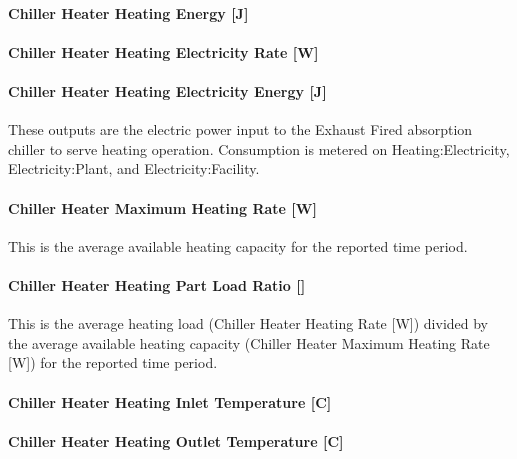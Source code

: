 \paragraph{Chiller Heater Heating Energy {[}J{]}}\label{chiller-heater-heating-energy-j-1}

\paragraph{Chiller Heater Heating Electricity Rate {[}W{]}}\label{chiller-heater-heating-electric-power-w-1}

\paragraph{Chiller Heater Heating Electricity Energy {[}J{]}}\label{chiller-heater-heating-electric-energy-j}

These outputs are the electric power input to the Exhaust Fired absorption chiller to serve heating operation. Consumption is metered on Heating:Electricity, Electricity:Plant, and Electricity:Facility.

\paragraph{Chiller Heater Maximum Heating Rate {[}W{]}}\label{chiller-heater-maximum-heating-rate-w}

This is the average available heating capacity for the reported time period.

\paragraph{Chiller Heater Heating Part Load Ratio {[]}}\label{chiller-heater-heating-part-load-ratio-1}

This is the average heating load (Chiller Heater Heating Rate {[}W{]}) divided by the average available heating capacity (Chiller Heater Maximum Heating Rate {[}W{]}) for the reported time period.

\paragraph{Chiller Heater Heating Inlet Temperature {[}C{]}}\label{chiller-heater-heating-inlet-temperature-c-1}

\paragraph{Chiller Heater Heating Outlet Temperature {[}C{]}}\label{chiller-heater-heating-outlet-temperature-c-1}

